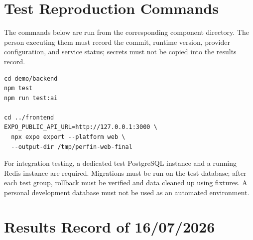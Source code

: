 \chapter{Test Reproduction Commands}

The commands below are run from the corresponding component directory. The person executing them must record the commit, runtime version, provider configuration, and service status; secrets must not be copied into the results record.

\begin{verbatim}
cd demo/backend
npm test
npm run test:ai

cd ../frontend
EXPO_PUBLIC_API_URL=http://127.0.0.1:3000 \
  npx expo export --platform web \
  --output-dir /tmp/perfin-web-final
\end{verbatim}

For integration testing, a dedicated test PostgreSQL instance and a running Redis instance are required. Migrations must be run on the test database; after each test group, rollback must be verified and data cleaned up using fixtures. A personal development database must not be used as an automated environment.

\chapter{Results Record of 16/07/2026}

